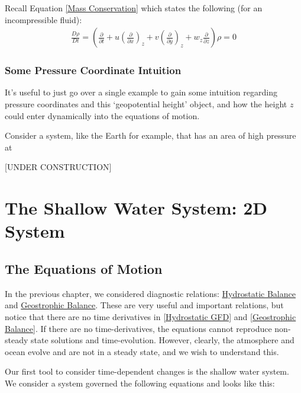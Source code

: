 Recall Equation \ref{Mass Conservation} which states the following (for an incompressible fluid):
\begin{align*}
    \frac{D\rho}{Dt}=\left( \frac{\partial }{\partial t} + u\left( \frac{\partial}{\partial x} \right)_{z}+v\left( \frac{\partial}{\partial y} \right)_{z}+w_z \frac{\partial}{\partial z}\right)\rho = 0
\end{align*}

\subsection{Some Pressure Coordinate Intuition}

It's useful to just go over a single example to gain some intuition regarding pressure coordinates and this `geopotential height' object, and how the height $z$ could enter dynamically into the equations of motion.

Consider a system, like the Earth for example, that has an area of high pressure at 

[UNDER CONSTRUCTION]

\chapter{The Shallow Water System: 2D System}\label{Shallow Water System}

\section{The Equations of Motion}

In the previous chapter, we considered diagnostic relations: \hyperref[Hydrostatic GFD Box]{Hydrostatic Balance} and \hyperref[Geostrophic Box]{Geostrophic Balance}. These are very useful and important relations, but notice that there are no time derivatives in \ref{Hydrostatic GFD} and \ref{Geostrophic Balance}. If there are no time-derivatives, the equations cannot reproduce non-steady state solutions and time-evolution. However, clearly, the atmosphere and ocean evolve and are not in a steady state, and we wish to understand this.

Our first tool to consider time-dependent changes is the shallow water system. We consider a system governed the following equations and looks like this:

